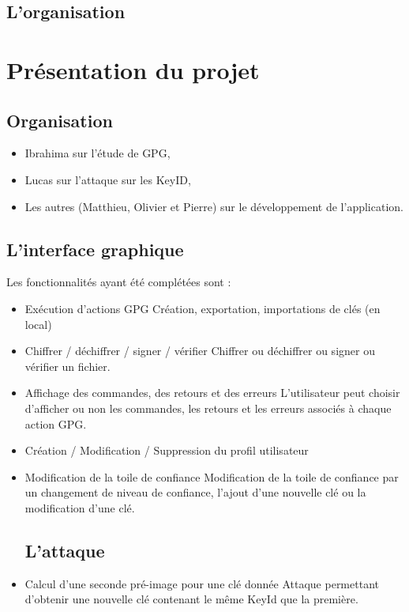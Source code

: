 \documentclass{../res/univ-projet}
\begin{document}
  \subsection{L'organisation}
    

\section{Présentation du projet}
    \subsection{Organisation}
    
    
    \begin{itemize}
      \item Ibrahima sur l'étude de GPG,
      \item Lucas sur l'attaque sur les KeyID,
      \item Les autres (Matthieu, Olivier et Pierre) sur le développement de l'application.
    \end{itemize}

  
  \subsection{L'interface graphique}
  
    Les fonctionnalités ayant été complétées sont :\medbreak
  \begin{itemize}
  \item Exécution d'actions GPG \smallbreak
  Création, exportation, importations de clés (en local)\smallbreak
  \item Chiffrer / déchiffrer / signer / vérifier \smallbreak
  Chiffrer ou déchiffrer ou signer ou vérifier un fichier. \smallbreak
  \item Affichage des commandes, des retours et des erreurs \smallbreak
  L'utilisateur peut choisir d'afficher ou non les commandes, les retours et les erreurs associés à chaque action GPG. \smallbreak 
  \item Création / Modification / Suppression du profil utilisateur \smallbreak
  \item Modification de la toile de confiance \smallbreak
  Modification de la toile de confiance par un changement de niveau de confiance, l'ajout d'une nouvelle clé ou la modification d'une clé.   
 
 \subsection{L'attaque}
  
  \item Calcul d'une seconde pré-image pour une clé donnée \smallbreak
  Attaque permettant d'obtenir une nouvelle clé contenant le même KeyId que la première.
  \end{itemize}
\end{document}
